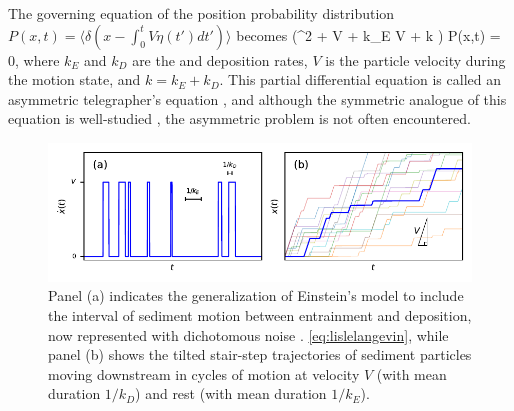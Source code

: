 The governing equation of the position probability distribution $P(x,t) = \langle \delta(x-\int_0^t V\eta(t')dt') \rangle$ becomes \DIFdelbegin {}\DIFdelend \DIFaddbegin {}\DIFaddend \be \big(\pt^2 + V \px \pt + k_E V \px + k \pt \big) P(x,t) = 0,\label{eq:lislemaster}\ee
where $k_E$ and $k_D$ are the \DIFdelbegin {}\DIFdelend \DIFaddbegin {}\DIFaddend and deposition rates, $V$ is the particle velocity during the motion state, and $k = k_E+k_D$. This partial differential equation is called an asymmetric telegrapher's equation \citep{Rossetto2018}, and although the symmetric analogue of this equation is well-studied \citep{Weiss2002a, Masoliver2017}, the asymmetric problem is not often encountered.
\begin{figure}[!htbp]
	\includegraphics[width=\linewidth,keepaspectratio]{./figures/ch1/lisleConcept.pdf}
	\caption{Panel (a) indicates the generalization of Einstein's model to include the interval of sediment motion between entrainment and deposition, now represented with dichotomous noise \DIFdelbeginFL {}\DIFdelendFL \DIFaddbeginFL {}\DIFaddendFL . \ref{eq:lislelangevin}, while panel (b) shows the tilted stair-step trajectories of sediment particles moving downstream in cycles of motion at velocity $V$ (with mean duration $1/k_D$) and rest (with mean duration $1/k_E$). }
	\label{fig:lislefig}
\end{figure}

